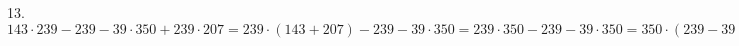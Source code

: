 13. $143\cdot239-239-39\cdot350+239\cdot207=239\cdot(143+207)-239-39\cdot350=239\cdot350-239-39\cdot350=350\cdot(239-39)-239=350\cdot200-239=70000-239=69761.$\\
